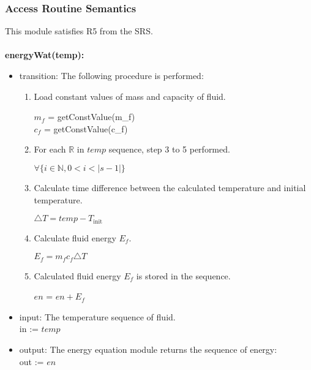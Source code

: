 \documentclass[12pt, titlepage]{article}
\begin{document}
\subsubsection{Access Routine Semantics}
This module satisfies R5 from the SRS. \\ \\
\noindent \textbf{energyWat(temp):}
\begin{itemize}
\item transition: The following procedure is performed:  
 \begin{enumerate}
    \item Load constant values of mass and capacity of fluid.  
        \begin{center}
            $m_f$ = getConstValue(m\_f) \\ 
            $c_f$ = getConstValue(c\_f)
        \end{center}
    \item For each $\mathbb{R}$ in $temp$ sequence, step 3 to 5 performed. 
    \begin{center}
        $\forall \{i \in \mathbb{N}, 0 < i < |s-1|\}$
    \end{center}
    \item Calculate time difference between the calculated temperature and initial temperature. 
        \begin{center} 
            $\triangle T = temp - T_\text{init}$ 
        \end{center}
    \item Calculate fluid energy $E_f$. 
        \begin{center} 
            $E_f = m_f c_f \triangle T$
        \end{center}
     \item Calculated fluid energy $E_f$ is stored in the sequence. 
        \begin{center}
            $en$ = $ en + E_f$ 
        \end{center}
     
 \end{enumerate}
\item input: The temperature sequence of fluid. \\ 
in := $temp$ 
\item output: The energy equation module returns the sequence of energy: \\ out := $ en$


\end{itemize}
\end{document}
